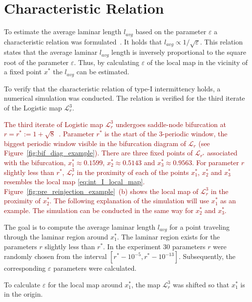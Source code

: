 \section{Characteristic Relation}
To estimate the average laminar length $l_{avg}$ based on the parameter $\varepsilon$ a characteristic relation was formulated~\cite{Elaskar2017}.
It holds that $l_{avg} \propto 1/\sqrt{\varepsilon}$.
This relation states that the average laminar $l_{avg}$ length is inversely proportional to the square root of the parameter $\varepsilon$.
Thus, by calculating $\varepsilon$ of the local map in the vicinity of a fixed point $x^{*}$ the $l_{avg}$ can be estimated.
\par
To verify that the characteristic relation of type-I intermittency holds, a numerical simulation was conducted.
The relation is verified for the third iterate of the Logistic map $\mathcal{L}_{r}^{3}$.
\par
\textcolor{darkred}{
The third iterate of Logistic map $\mathcal{L}_{r}^{3}$ undergoes saddle-node bifurcation at $r = r^{*} := 1+\sqrt{8}$~\cite{Elaskar2022,Gordon20180411}.
Parameter $r^{*}$ is the start of the $3$-periodic window, the biggest periodic window visible in the bifurcation diagram of $\mathcal{L}_{r}$ (see Figure~\ref{fig:bif_diag_example}).
There are three fixed points of $\mathcal{L}_{r^{*}}$ associated with the bifurcation, $x^{*}_{1} \approx 0.1599$, $x^{*}_{2} \approx 0.5143$ and $x^{*}_{3} \approx 0.9563$.
For parameter $r$ slightly less than $r^{*}$, $\mathcal{L}_{r}^{3}$ in the proximity of each of the points $x^{*}_{1}$, $x^{*}_{2}$ and $x^{*}_{3}$ resembles the local map \eqref{eq:int_I_local_map}.
Figure~\ref{fig:pre_reinjection_example}~(b) shows the local map of $\mathcal{L}_{r}^{3}$ in the proximity of $x^{*}_{2}$.
The following explanation of the simulation will use $x^{*}_{1}$ as an example.
The simulation can be conducted in the same way for $x^{*}_{2}$ and $x^{*}_{3}$.
}
\par
The goal is to compute the average laminar length $l_{avg}$ for a point traveling through the laminar region around $x^{*}_{1}$.
The laminar region exists for the parameters $r$ slightly less than $r^{*}$.
In the experiment $30$ parameters $r$ were randomly chosen from the interval $[ r^{*}-10^{-5}, r^{*}-10^{-13} ]$.
Subsequently, the corresponding $\varepsilon$ parameters were calculated.
\par
To calculate $\varepsilon$ for the local map around $x^{*}_{1}$, the map $\mathcal{L}_{r}^{3}$ was shifted so that $x^{*}_{1}$ is in the origin.
